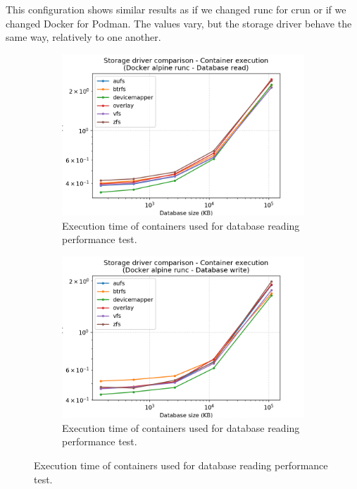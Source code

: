 This configuration shows similar results as if we changed runc for crun or if we changed Docker for Podman.  The values vary, but the storage driver behave the same way, relatively to one another.


\begin{figure}[h!]
    \begin{subfigure}{.5\textwidth}
      \centering
      \includegraphics[width=\linewidth]{images/storage-driver/storage-driver-execution-Docker-alpine-runc---Database-read.png}
      \caption{Execution time of containers used for database reading performance test.}
      \label{fig:storage-driver:runc:db-read-exec}
    \end{subfigure}
    \begin{subfigure}{.5\textwidth}
      \centering
      \includegraphics[width=\linewidth]{images/storage-driver/storage-driver-execution-Docker-alpine-runc---Database-write.png}
      \caption{Execution time of containers used for database reading performance test.}
      \label{fig:storage-driver:runc:db-write-exec}
    \end{subfigure}
    

\end{figure}
